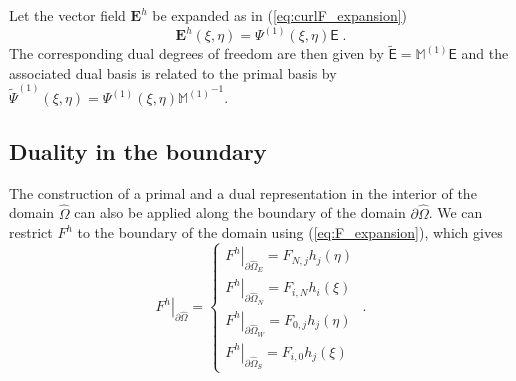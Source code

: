 \documentclass[graybox]{svmult}
\begin{document}
Let the vector field $\bm{E}^h$ be expanded as in (\ref{eq:curlF_expansion})
\[ \bm{E}^h(\xi,\eta) = \Psi^{(1)}(\xi,\eta) \mathsf{E} \;.\]
The corresponding dual degrees of freedom are then given by $\widetilde{\mathsf{E}} = \mathbb{M}^{(1)}\mathsf{E}$ and the associated dual basis is related to the primal basis by $\widetilde{\Psi}^{(1)}(\xi,\eta) = \Psi^{(1)}(\xi,\eta) {\mathbb{M}^{(1)}}^{-1}$.

\subsection{Duality in the boundary}
\label{sec:duality_boundary}
The construction of a primal and a dual representation in the interior of the domain $\hat{\Omega}$ can also be applied along the boundary of the domain $\partial \hat{\Omega}$. We can restrict $F^h$ to the boundary of the domain using (\ref{eq:F_expansion}), which gives
\begin{equation}
 \left . F^h \right |_{\partial \hat{\Omega}} = \left \{ \begin{array}{l}
 \left . F^h \right |_{\partial \hat{\Omega}_E} = F_{N,j}h_j(\eta) \\[1ex]
 \left . F^h \right |_{\partial \hat{\Omega}_N} = F_{i,N}h_i(\xi) \\[1ex]
 \left . F^h \right |_{\partial \hat{\Omega}_W} = F_{0,j}h_j(\eta) \\[1ex]
 \left . F^h \right |_{\partial \hat{\Omega}_S} = F_{i,0}h_j(\xi)
 \end{array} \right . \;.
\end{equation}
\end{document}
